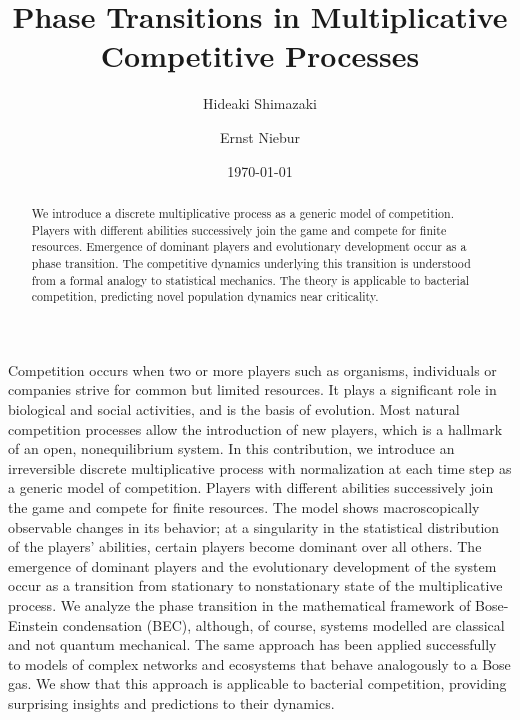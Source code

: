 \documentclass[amsmath,amssymb,floatf
ix]{revtex4}
\begin{document}
\title{Phase Transitions in Multiplicative Competitive Processes}
\author{Hideaki Shimazaki}
\author{Ernst Niebur}
\date{\today}
\def\be{\begin{equation}}
\def\en{\end{equation}}
\newcommand{\figref}[1]{FIG.~\ref{#1}}
\newcommand{\Eq}[1]{Eq.~\ref{#1}}

\begin{abstract}
We introduce a discrete multiplicative process as a generic model of
competition. Players with different abilities successively join the
game and compete for finite resources.  Emergence of dominant players
and evolutionary development occur as a phase transition. The competitive dynamics underlying this transition is understood from a formal analogy to statistical mechanics.
The theory is applicable to bacterial competition, predicting novel population dynamics near
criticality.
\end{abstract}
\maketitle

Competition occurs when two or more players such as organisms,
individuals or companies strive for common but limited resources. It
plays a significant role in biological and social activities, and is
the basis of evolution.
Most natural competition processes allow the
introduction of new players, which is a hallmark of an open,
nonequilibrium system.
In this contribution, we introduce an irreversible discrete multiplicative process with
normalization at each time step as a generic model of competition. Players with different abilities successively join the
game and compete for finite resources.  The model shows
macroscopically observable changes in its behavior; at a singularity
in the statistical distribution of the players' abilities, certain
players become dominant over all others.
The emergence of dominant
players and the evolutionary development of the system occur as a
transition from stationary to nonstationary state of the
multiplicative process.  We analyze the phase
transition in the mathematical framework of Bose-Einstein condensation
(BEC), although, of course, systems modelled are classical
and not quantum mechanical. The same approach has been applied
successfully to models of complex networks \cite{Bianconi01} and
ecosystems \cite{Volkov04} that behave
analogously to a Bose gas. We show that this approach is applicable to
bacterial competition, providing surprising insights and
predictions to their dynamics.
\end{document}
